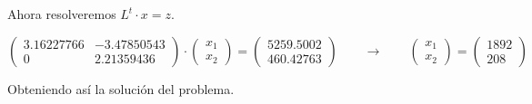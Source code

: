 \begin{frame}
\begin{solution}
\begin{enumerate}[d)]
			      Ahora resolveremos $L^{t}\cdot x=z$.

			      \begin{equation*}
				      \begin{pmatrix}
					      3.16227766 & -3.47850543 \\
					      0          & 2.21359436
				      \end{pmatrix}
				      \cdot
				      \begin{pmatrix}
					      x_{1} \\
					      x_{2}
				      \end{pmatrix}
				      =
				      \begin{pmatrix}
					      5259.5002 \\
					      460.42763
				      \end{pmatrix}
				      \qquad
				      \longrightarrow
				      \qquad
				      \begin{pmatrix}
					      x_{1} \\
					      x_{2}
				      \end{pmatrix}
				      =
				      \begin{pmatrix}
					      1892 \\
					      208
				      \end{pmatrix}
			      \end{equation*}

			      Obteniendo así la solución del problema.

		\end{enumerate}
	\end{solution}
\end{frame}